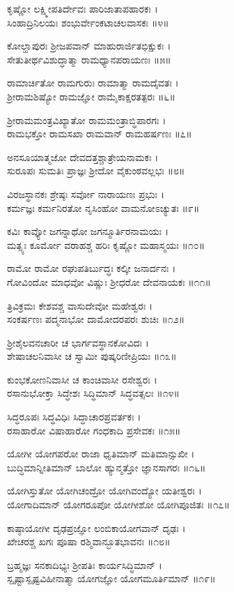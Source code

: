 ಕೃಷ್ಣೋ ಲಕ್ಷ್ಮೀಪತಿರ್ದೇವಃ ಪಾರಿಜಾತಾಪಹಾರಕಃ ।\\
ಸಿಂಹಾದ್ರಿನಿಲಯಃ ಶಂಭುರ್ವೇಂಕಟಾಚಲವಾಸಕಃ ॥೪॥

ಕೋಲ್ಹಾಪುರಃ ಶ್ರೀಜಪವಾನ್ ಮಾಹುರಾರ್ಜಿತಭಿಕ್ಷುಕಃ ।\\
ಸೇತುತೀರ್ಥವಿಶುದ್ಧಾತ್ಮಾ ರಾಮಧ್ಯಾನಪರಾಯಣಃ ॥೫॥

ರಾಮಾರ್ಚಿತೋ ರಾಮಗುರುಃ ರಾಮಾತ್ಮಾ ರಾಮದೈವತಃ ।\\
ಶ್ರೀರಾಮಶಿಷ್ಯೋ ರಾಮಜ್ಞೋ ರಾಮೈಕಾಕ್ಷರತತ್ಪರಃ ॥೬॥

ಶ್ರೀರಾಮಮಂತ್ರವಿಖ್ಯಾತೋ ರಾಮಮಂತ್ರಾಬ್ಧಿಪಾರಗಃ ।\\
ರಾಮಭಕ್ತೋ ರಾಮಸಖಾ ರಾಮವಾನ್ ರಾಮಹರ್ಷಣಃ ॥೭॥

ಅನಸೂಯಾತ್ಮಜೋ ದೇವದತ್ತಶ್ಚಾತ್ರೇಯನಾಮಕಃ ।\\
ಸುರೂಪಃ ಸುಮತಿಃ ಪ್ರಾಜ್ಞಃ ಶ್ರೀದೋ ವೈಕುಂಠವಲ್ಲಭಃ ॥೮॥

ವಿರಜಸ್ಥಾನಕಃ ಶ್ರೇಷ್ಠಃ ಸರ್ವೋ ನಾರಾಯಣಃ ಪ್ರಭುಃ ।\\
ಕರ್ಮಜ್ಞಃ ಕರ್ಮನಿರತೋ ನೃಸಿಂಹೋ ವಾಮನೋಽಚ್ಯುತಃ ॥೯॥

ಕವಿಃ ಕಾವ್ಯೋ ಜಗನ್ನಾಥೋ ಜಗನ್ಮೂರ್ತಿರನಾಮಯಃ ।\\
ಮತ್ಸ್ಯಃ ಕೂರ್ಮೋ ವರಾಹಶ್ಚ ಹರಿಃ ಕೃಷ್ಣೋ ಮಹಾಸ್ಮಯಃ ॥೧೦॥

ರಾಮೋ ರಾಮೋ ರಘುಪತಿರ್ಬುದ್ಧಃ ಕಲ್ಕೀ ಜನಾರ್ದನಃ ।\\
ಗೋವಿಂದೋ ಮಾಧವೋ ವಿಷ್ಣುಃ ಶ್ರೀಧರೋ ದೇವನಾಯಕಃ ॥೧೧॥

ತ್ರಿವಿಕ್ರಮಃ ಕೇಶವಶ್ಚ ವಾಸುದೇವೋ ಮಹೇಶ್ವರಃ ।\\
ಸಂಕರ್ಷಣಃ ಪದ್ಮನಾಭೋ ದಾಮೋದರಪರಃ ಶುಚಿಃ ॥೧೨॥

ಶ್ರೀಶೈಲವನಚಾರೀ ಚ ಭಾರ್ಗವಸ್ಥಾನಕೋವಿದಃ ।\\
ಶೇಷಾಚಲನಿವಾಸೀ ಚ ಸ್ವಾಮೀ ಪುಷ್ಕರಿಣೀಪ್ರಿಯಃ ॥೧೩॥

ಕುಂಭಕೋಣನಿವಾಸೀ ಚ ಕಾಂಚಿವಾಸೀ ರಸೇಶ್ವರಃ ।\\
ರಸಾನುಭೋಕ್ತಾ ಸಿದ್ಧೇಶಃ ಸಿದ್ಧಿಮಾನ್ ಸಿದ್ಧವತ್ಸಲಃ ॥೧೪॥

ಸಿದ್ಧರೂಪಃ ಸಿದ್ಧವಿಧಿಃ ಸಿದ್ಧಾಚಾರಪ್ರವರ್ತಕಃ ।\\
ರಸಾಹಾರೋ ವಿಷಾಹಾರೋ ಗಂಧಕಾದಿ ಪ್ರಸೇವಕಃ ॥೧೫॥

ಯೋಗೀ ಯೋಗಪರೋ ರಾಜಾ ಧೃತಿಮಾನ್ ಮತಿಮಾನ್ಸುಖೀ ।\\
ಬುದ್ಧಿಮಾನ್ನೀತಿಮಾನ್ ಬಾಲೋ ಹ್ಯುನ್ಮತ್ತೋ ಜ್ಞಾನಸಾಗರಃ ॥೧೬॥

ಯೋಗಿಸ್ತುತೋ ಯೋಗಿಚಂದ್ರೋ ಯೋಗಿವಂದ್ಯೋ ಯತೀಶ್ವರಃ ।\\
ಯೋಗಾದಿಮಾನ್ ಯೋಗರೂಪೋ ಯೋಗೀಶೋ ಯೋಗಿಪೂಜಿತಃ ॥೧೭॥

ಕಾಷ್ಠಾಯೋಗೀ ದೃಢಪ್ರಜ್ಞೋ ಲಂಬಿಕಾಯೋಗವಾನ್ ದೃಢಃ ।\\
ಖೇಚರಶ್ಚ ಖಗಃ ಪೂಷಾ ರಶ್ಮಿವಾನ್ಭೂತಭಾವನಃ ॥೧೮॥

ಬ್ರಹ್ಮಜ್ಞಃ ಸನಕಾದಿಭ್ಯಃ ಶ್ರೀಪತಿಃ ಕಾರ್ಯಸಿದ್ಧಿಮಾನ್ ।\\
ಸ್ಪೃಷ್ಟಾಸ್ಪೃಷ್ಟವಿಹೀನಾತ್ಮಾ ಯೋಗಜ್ಞೋ ಯೋಗಮೂರ್ತಿಮಾನ್ ॥೧೯॥

